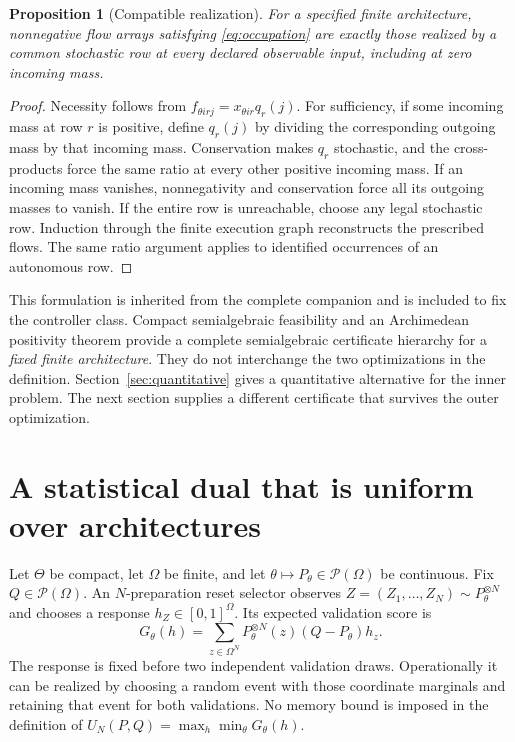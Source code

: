 \documentclass[11pt]{amsart}
\newtheorem{proposition}[theorem]{Proposition}
\theoremstyle{definition}\newtheorem{definition}[theorem]{Definition}
\theoremstyle{remark}\newtheorem{remark}[theorem]{Remark}
\newcommand{\1}{\mathbf 1}
\newcommand{\cP}{\mathcal P}
\begin{document}
\begin{proposition}[Compatible realization]\label{prop:realization}
For a specified finite architecture, nonnegative flow arrays satisfying
\eqref{eq:occupation} are exactly those realized by a common stochastic
row at every declared observable input, including at zero incoming mass.
\end{proposition}
\begin{proof}
Necessity follows from $f_{\theta i rj}=x_{\theta i r}q_r(j)$.
For sufficiency, if some incoming mass at row $r$ is positive, define
$q_r(j)$ by dividing the corresponding outgoing mass by that incoming
mass. Conservation makes $q_r$ stochastic, and the cross-products force
the same ratio at every other positive incoming mass. If an incoming
mass vanishes, nonnegativity and conservation force all its outgoing
masses to vanish. If the entire row is unreachable, choose any legal
stochastic row. Induction through the finite execution graph reconstructs
the prescribed flows. The same ratio argument applies to identified
occurrences of an autonomous row.
\end{proof}

This formulation is inherited from the complete companion and is included
to fix the controller class. Compact semialgebraic feasibility and an
Archimedean positivity theorem provide a complete semialgebraic certificate
hierarchy for a \emph{fixed finite architecture}. They do not interchange
the two optimizations in the definition. Section~\ref{sec:quantitative}
gives a quantitative alternative for the inner problem. The next section
supplies a different certificate that survives the outer optimization.

\section{A statistical dual that is uniform over architectures}
\label{sec:dual}
Let $\Theta$ be compact, let $\Omega$ be finite, and let
$\theta\mapsto P_\theta\in\cP(\Omega)$ be continuous. Fix
$Q\in\cP(\Omega)$. An $N$-preparation reset selector observes
$Z=(Z_1,\ldots,Z_N)\sim P_\theta^{\otimes N}$ and chooses a response
$h_Z\in[0,1]^\Omega$. Its expected validation score is
\begin{equation}\label{eq:selector}
 G_\theta(h)=\sum_{z\in\Omega^N}P_\theta^{\otimes N}(z)
                           (Q-P_\theta)h_z.
\end{equation}
The response is fixed before two independent validation draws. Operationally
it can be realized by choosing a random event with those coordinate
marginals and retaining that event for both validations. No memory bound
is imposed in the definition of
$U_N(P,Q)=\max_h\min_\theta G_\theta(h)$.
\end{document}
